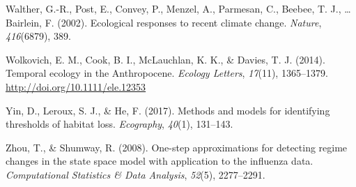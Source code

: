 \documentclass[12pt,twoside,openany]{reedthesis}
\begin{document}
\leavevmode\hypertarget{ref-walther_ecological_2002}{}%
Walther, G.-R., Post, E., Convey, P., Menzel, A., Parmesan, C., Beebee, T. J., \ldots{} Bairlein, F. (2002). Ecological responses to recent climate change. \emph{Nature}, \emph{416}(6879), 389.

\leavevmode\hypertarget{ref-wolkovich_temporal_2014}{}%
Wolkovich, E. M., Cook, B. I., McLauchlan, K. K., \& Davies, T. J. (2014). Temporal ecology in the Anthropocene. \emph{Ecology Letters}, \emph{17}(11), 1365--1379. \url{http://doi.org/10.1111/ele.12353}

\leavevmode\hypertarget{ref-yin2017methods}{}%
Yin, D., Leroux, S. J., \& He, F. (2017). Methods and models for identifying thresholds of habitat loss. \emph{Ecography}, \emph{40}(1), 131--143.

\leavevmode\hypertarget{ref-zhou2008one}{}%
Zhou, T., \& Shumway, R. (2008). One-step approximations for detecting regime changes in the state space model with application to the influenza data. \emph{Computational Statistics \& Data Analysis}, \emph{52}(5), 2277--2291.
\end{document}
